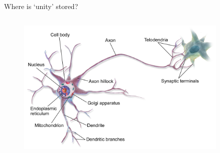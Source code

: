 \documentclass[xcolor=dvipsnames]{beamer}
\begin{document}
\begin{frame}[fragile]{Where is `unity' stored?}
  \begin{columns}[T] %
    \begin{column}{0.99\textwidth}
      \begin{figure}[H]
        \centering
        \includegraphics[width=0.9\textwidth]{neuron}
      \end{figure}
    \end{column}%
  \end{columns}
\end{frame}
\end{document}
